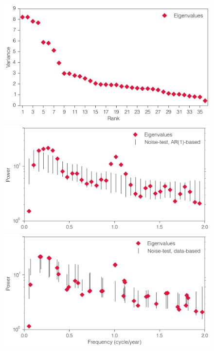 \begin{figure}[!h]
  \centering
  \vspace{1.4cm}
  \includegraphics[width=.72\textwidth]{img/mssa_eigen_var_v3.png}\\
  \includegraphics[width=.74\textwidth]{img/mssa_spec_ar1_v3.png}\\
  \includegraphics[width=.74\textwidth]{img/mssa_spec_data_v3.png}
  \vspace{1.4cm}
\end{figure}
